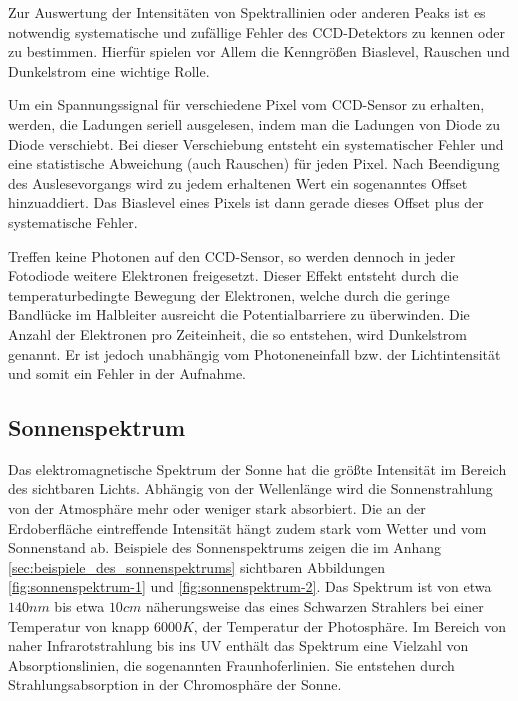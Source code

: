 		Zur Auswertung der Intensitäten von Spektrallinien oder anderen Peaks ist es notwendig systematische und zufällige Fehler des CCD-Detektors zu kennen oder zu bestimmen.
		Hierfür spielen vor Allem die Kenngrößen Biaslevel, Rauschen und Dunkelstrom eine wichtige Rolle.
		
		Um ein Spannungssignal für verschiedene Pixel vom CCD-Sensor zu erhalten, werden, die Ladungen seriell ausgelesen, indem man die Ladungen von Diode zu Diode verschiebt.
		Bei dieser Verschiebung entsteht ein systematischer Fehler und eine statistische Abweichung (auch Rauschen) für jeden Pixel.
		Nach Beendigung des Auslesevorgangs wird zu jedem erhaltenen Wert ein sogenanntes Offset hinzuaddiert.
		Das Biaslevel eines Pixels ist dann gerade dieses Offset plus der systematische Fehler.

		Treffen keine Photonen auf den CCD-Sensor, so werden dennoch in jeder Fotodiode weitere Elektronen freigesetzt.
		Dieser Effekt entsteht durch die temperaturbedingte Bewegung der Elektronen, welche durch die geringe Bandlücke im Halbleiter ausreicht die Potentialbarriere zu überwinden.
		Die Anzahl der Elektronen pro Zeiteinheit, die so entstehen, wird Dunkelstrom genannt.
		Er ist jedoch unabhängig vom Photoneneinfall bzw. der Lichtintensität und somit ein Fehler in der Aufnahme.


	\subsection{Sonnenspektrum} %
	\label{sub:sonnenspektrum}

		Das elektromagnetische Spektrum der Sonne hat die größte Intensität im Bereich des sichtbaren Lichts. 
		Abhängig von der Wellenlänge wird die Sonnenstrahlung von der Atmosphäre mehr oder weniger stark absorbiert. 
		Die an der Erdoberfläche eintreffende Intensität hängt zudem stark vom Wetter und vom Sonnenstand ab.
		Beispiele des Sonnenspektrums zeigen die im Anhang \ref{sec:beispiele_des_sonnenspektrums} sichtbaren Abbildungen \ref{fig:sonnenspektrum-1} und \ref{fig:sonnenspektrum-2}.
		Das Spektrum ist von etwa $140 \unit{nm}$ bis etwa $10 \unit{cm}$ näherungsweise das eines Schwarzen Strahlers bei einer Temperatur von knapp $6000 \unit{K}$, der Temperatur der Photosphäre.
		Im Bereich von naher Infrarotstrahlung bis ins UV enthält das Spektrum eine Vielzahl von Absorptionslinien, die sogenannten Fraunhoferlinien. 
		Sie entstehen durch Strahlungsabsorption in der Chromosphäre der Sonne.
	

